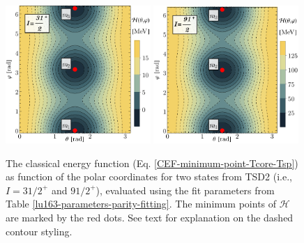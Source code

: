 \begin{figure}
    \centering
    \includegraphics[width=0.49\textwidth]{Chapters/Figures/parity-partners-plots/contour-tsd2-1.pdf}
    \includegraphics[width=0.49\textwidth]{Chapters/Figures/parity-partners-plots/contour-tsd2-2.pdf}
    \caption{The classical energy function (Eq. \ref{CEF-minimum-point-Tcore-Tsp}) as function of the polar coordinates for two states from TSD2 (i.e., $I=31/2^+$ and $91/2^+$), evaluated using the fit parameters from Table \ref{lu163-parameters-parity-fitting}. The minimum points of $\mathcal{H}$ are marked by the red dots. See text for explanation on the dashed contour styling.}
    \label{contour-cef-polar-tsd2}
\end{figure}
